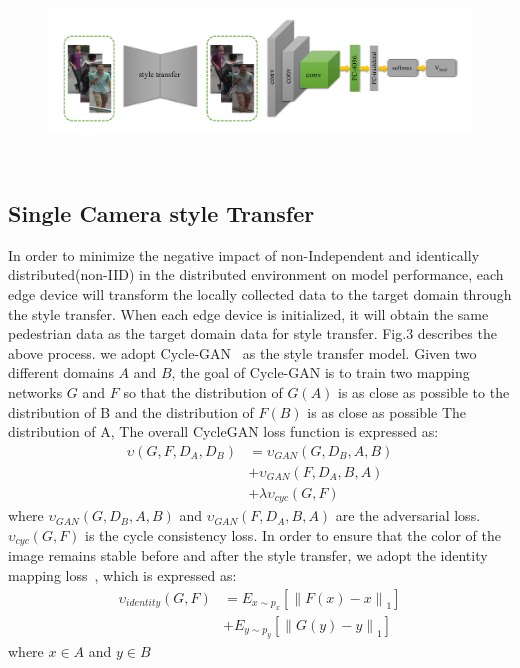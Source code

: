 \documentclass{article}
\begin{document}
\begin{figure}[htb]
    \includegraphics[width=18cm,height=5cm]{fig_2.pdf}
    \caption{}
    \label{}
\end{figure}





\subsection{Single Camera style Transfer}
In order to minimize the negative impact of non-Independent and identically distributed(non-IID) in the distributed environment on model performance, each edge device will transform the locally collected data to the target domain through the style transfer. When each edge device is initialized, it will obtain the same pedestrian data as the target domain data for style transfer. Fig.3 describes the above process. we adopt Cycle-GAN~\cite{zhu2017unpaired} as the style transfer model. Given two different domains $A$ and $B$, the goal of Cycle-GAN is to train two mapping networks $G$ and $F$ so that the distribution of $G(A)$ is as close as possible to the distribution of B and the distribution of $F(B)$ is as close as possible The distribution of A, The overall CycleGAN loss function is expressed as:
\begin{equation}
\begin{aligned}
\upsilon (G,F,D_{A},D_{B})&=\upsilon_{GAN}(G,D_{B},A,B)\\
&+\upsilon_{GAN}(F,D_{A},B,A)\\
&+\lambda \upsilon_{cyc}(G,F)
\end{aligned}
\end{equation}
where $\upsilon_{GAN}(G,D_{B},A,B)$ and $\upsilon_{GAN}(F,D_{A},B,A)$ are the adversarial loss. $\upsilon_{cyc}(G,F)$ is the cycle consistency loss. In order to ensure that the color of the image remains stable before and after the style transfer, we adopt the identity mapping loss~\cite{zhu2017unpaired}, which is expressed as:
\begin{equation}
\begin{aligned}
    \upsilon_{identity}(G,F) & = E_{x\sim p_{x}} \left [ \left \| F(x) - x \right \|_{1} \right ]\\
    &+E_{y\sim p_{y}} \left [ \left \| G(y) - y \right \|_{1} \right ]
\end{aligned}
\end{equation}
where $x\in A$ and $y\in B$
\end{document}
